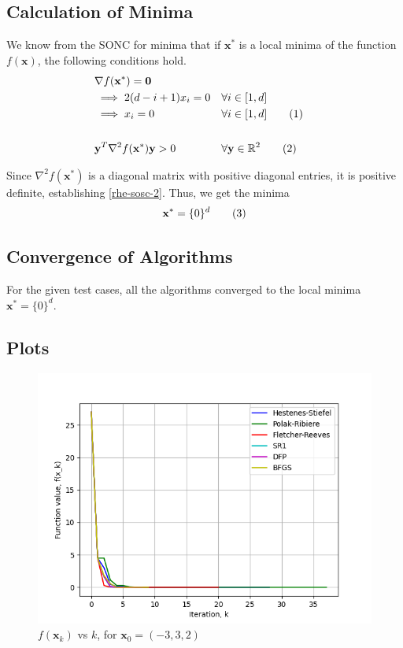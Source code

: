 \documentclass[a4paper]{article}
\newcommand\numberthis{\addtocounter{equation}{1}\tag{\theequation}}
\begin{document}
\subsection{Calculation of Minima}

We know from the SONC for minima that if $\textbf{x}^*$ is a local minima of the function $f(\textbf{x})$, the following conditions hold.
\begin{align*}
&\nabla f(\textbf{x}^*) = \textbf{0} \\
&\implies 2 (d - i + 1) x_i = 0 &&\forall i \in [1, d] \\
&\implies x_i = 0 &&\forall i \in [1, d] \numberthis \label{rhe-sosc-1} \\ \\
&\textbf{y}^T \nabla^2 f(\textbf{x}^*) \textbf{y} > 0 &&\forall \textbf{y} \in \mathbb{R}^2 \numberthis \label{rhe-sosc-2}
\end{align*}

Since $\nabla^2 f(\textbf{x}^*)$ is a diagonal matrix with positive diagonal entries, it is positive definite, establishing \eqref{rhe-sosc-2}. Thus, we get the minima
\begin{align*}
\textbf{x}^* = \{0\}^d \numberthis \label{rhe-minima}
\end{align*}

\subsection{Convergence of Algorithms}

For the given test cases, all the algorithms converged to the local minima $\textbf{x}^* = \{0\}^d$.

\subsection{Plots}

\begin{figure}[H]
    \centering
    \includegraphics[width=.65\textwidth]{images/hyperellipsoid_function_vals.png}
    \caption{$f(\textbf{x}_k)$ vs $k$, for $\textbf{x}_0 = (-3, 3, 2)$}
\end{figure}
\end{document}
